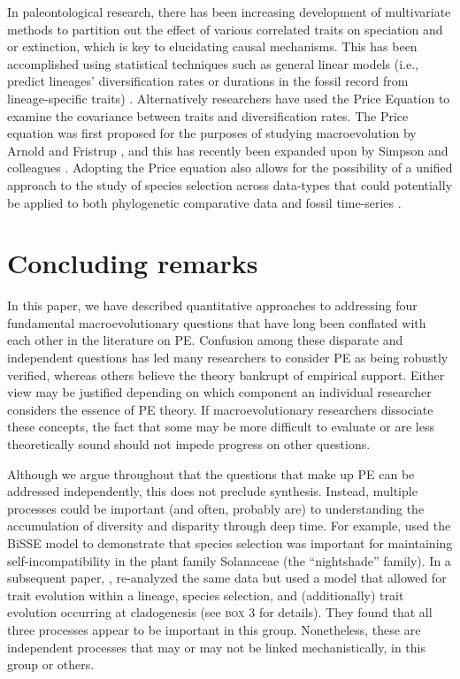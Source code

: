 In paleontological research, there has been increasing development of multivariate methods to partition out the effect of various correlated traits on speciation and or extinction, which is key to elucidating causal mechanisms. This has been accomplished using statistical techniques such as general linear models (i.e., predict lineages' diversification rates or durations in the fossil record from lineage-specific traits) \citep{JablonskiHunt2006, Harnik2011, Harnik2012}. Alternatively researchers have used the Price Equation \citep{Price1972, Rice2004, Okasha2006, Frank2012} to examine the covariance between traits and diversification rates. The Price equation was first proposed for the purposes of studying macroevolution by Arnold and Fristrup \citep{ArnoldFristrup1982}, and this has recently been expanded upon by Simpson and colleagues \citep{SimpsonHarnik2009, Simpson2010}. Adopting the Price equation also allows for the possibility of a unified approach to the study of species selection across data-types that could potentially be applied to both phylogenetic comparative data and fossil time-series \citep{Simpson2013, Jablonski2008}. 

\section{Concluding remarks}

In this paper, we have described quantitative approaches to addressing four fundamental macroevolutionary questions that have long been conflated with each other in the literature on PE. Confusion among these disparate and independent questions has led many researchers to consider PE as being robustly verified, whereas others believe the theory bankrupt of empirical support. Either view may be justified depending on which component an individual researcher considers the essence of PE theory. If macroevolutionary researchers dissociate these concepts, the fact that some may be more difficult to evaluate or are less theoretically sound should not impede progress on other questions.

Although we argue throughout that the questions that make up PE can be addressed independently, this does not preclude synthesis. Instead, multiple processes could be important (and often, probably are) to understanding the accumulation of diversity and disparity through deep time. For example, \citet{Goldberg2010} used the BiSSE model to demonstrate that species selection was important for maintaining self-incompatibility in the plant family Solanaceae (the ``nightshade'' family). In a subsequent paper, \citet{Goldberg2012}, re-analyzed the same data but used a model that allowed for trait evolution within a lineage, species selection, and (additionally) trait evolution occurring at cladogenesis (see \textsc{box 3} for details). They found that all three processes appear to be important in this group. Nonetheless, these are independent processes that may or may not be linked mechanistically, in this group or others.

